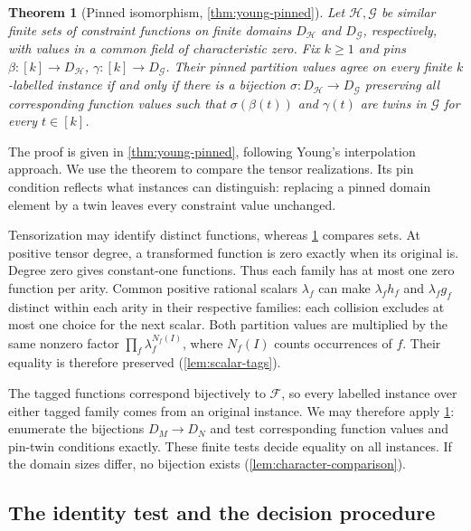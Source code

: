 \documentclass[11pt,letterpaper,onecolumn]{article}
\theoremstyle{plain}
\newtheorem{theorem}{Theorem}[section]
\theoremstyle{definition}
\theoremstyle{remark}
\newcommand{\cF}{\mathcal F}
\begin{document}
\begin{theorem}[Pinned isomorphism, \cref{thm:young-pinned}]
\label{s:thm:pinned}
Let $\mathcal H,\mathcal G$ be similar finite sets of constraint
functions on finite domains $D_{\mathcal H}$ and $D_{\mathcal G}$,
respectively, with values in a common field of characteristic zero.
Fix $k\ge1$ and pins $\beta:[k]\to D_{\mathcal H}$,
$\gamma:[k]\to D_{\mathcal G}$.
Their pinned partition values agree on every finite $k$-labelled
instance if and only if there is a bijection
$\sigma:D_{\mathcal H}\to D_{\mathcal G}$ preserving all
corresponding function values such that $\sigma(\beta(t))$ and
$\gamma(t)$ are twins in $\mathcal G$ for every $t\in[k]$.
\end{theorem}

The proof is given in \cref{thm:young-pinned}, following Young's
interpolation approach. We use the theorem to compare the tensor
realizations. Its pin condition reflects what instances can distinguish:
replacing a pinned domain element by a twin leaves every constraint
value unchanged.

Tensorization may identify distinct functions, whereas
\cref{s:thm:pinned} compares sets. At positive tensor degree, a transformed
function is zero exactly when its original is. Degree zero gives constant-one
functions. Thus each family has at most one zero function per arity.
Common positive rational scalars $\lambda_f$ can make $\lambda_fh_f$ and
$\lambda_fg_f$ distinct within each arity in their respective families:
each collision excludes at most one choice for the next scalar.
Both partition values are multiplied by the same nonzero factor
$\prod_f\lambda_f^{N_f(I)}$, where $N_f(I)$ counts occurrences of $f$.
Their equality is therefore preserved (\cref{lem:scalar-tags}).

The tagged functions correspond bijectively to $\cF$, so every labelled
instance over either tagged family comes from an original instance.
We may therefore apply \cref{s:thm:pinned}: enumerate the bijections
$D_M\to D_N$ and test corresponding function values and pin-twin
conditions exactly. These finite tests decide equality on all instances.
If the domain sizes differ, no bijection exists
(\cref{lem:character-comparison}).

\subsection{The identity test and the decision procedure}
\end{document}
